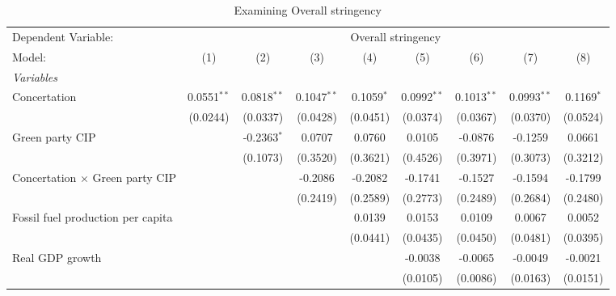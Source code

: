 
\begin{table}[htbp]
   \caption{Examining Overall stringency}
   \centering
   \begin{tabular}{lcccccccc}
      \tabularnewline \midrule \midrule
      Dependent Variable: & \multicolumn{8}{c}{Overall stringency}\\
      Model:                                  & (1)           & (2)           & (3)           & (4)          & (5)           & (6)           & (7)           & (8)\\  
      \midrule
      \emph{Variables}\\
      Concertation                            & 0.0551$^{**}$ & 0.0818$^{**}$ & 0.1047$^{**}$ & 0.1059$^{*}$ & 0.0992$^{**}$ & 0.1013$^{**}$ & 0.0993$^{**}$ & 0.1169$^{*}$\\   
                                              & (0.0244)      & (0.0337)      & (0.0428)      & (0.0451)     & (0.0374)      & (0.0367)      & (0.0370)      & (0.0524)\\   
      Green party CIP                         &               & -0.2363$^{*}$ & 0.0707        & 0.0760       & 0.0105        & -0.0876       & -0.1259       & 0.0661\\   
                                              &               & (0.1073)      & (0.3520)      & (0.3621)     & (0.4526)      & (0.3971)      & (0.3073)      & (0.3212)\\   
      Concertation $\times$ Green party CIP   &               &               & -0.2086       & -0.2082      & -0.1741       & -0.1527       & -0.1594       & -0.1799\\   
                                              &               &               & (0.2419)      & (0.2589)     & (0.2773)      & (0.2489)      & (0.2684)      & (0.2480)\\   
      Fossil fuel production per capita       &               &               &               & 0.0139       & 0.0153        & 0.0109        & 0.0067        & 0.0052\\   
                                              &               &               &               & (0.0441)     & (0.0435)      & (0.0450)      & (0.0481)      & (0.0395)\\   
      Real GDP growth                         &               &               &               &              & -0.0038       & -0.0065       & -0.0049       & -0.0021\\   
                                              &               &               &               &              & (0.0105)      & (0.0086)      & (0.0163)      & (0.0151)\\   

\end{tabular}
\end{table}
